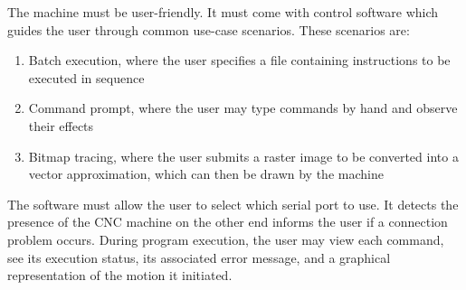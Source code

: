 The machine must be user-friendly. It must come with control software which
guides the user through common use-case scenarios. These scenarios are:
\begin{enumerate}
    \item Batch execution, where the user specifies a file containing
    instructions to be executed in sequence
    \item Command prompt, where the user may type commands by hand and observe
    their effects
    \item Bitmap tracing, where the user submits a raster image to be converted
    into a vector approximation, which can then be drawn by the machine
\end{enumerate}

The software must allow the user to select which serial port to use. It detects
the presence of the CNC machine on the other end informs the user if a
connection problem occurs. During program execution, the user may view each
command, see its execution status, its associated error message, and a graphical
representation of the motion it initiated.
